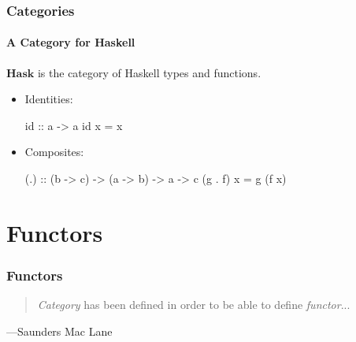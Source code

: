 \documentclass{beamer}
\newcommand{\catbf}[1]{\ensuremath{\mathbf{#1}}\xspace}
\newcommand{\hask}{\catbf{Hask}}
\begin{document}

\begin{frame}[fragile]
  \frametitle{Categories}
  \framesubtitle{A Category for Haskell}

  \begin{example}
    \hask is the category of Haskell types and functions.
    \begin{itemize}
    \item
      Identities:
      \begin{code}
id :: a -> a
id x = x
      \end{code}
    \item
      Composites:
      \begin{code}
(.) :: (b -> c) -> (a -> b) -> a -> c
(g . f) x = g (f x)
      \end{code}
    \end{itemize}
  \end{example}

\end{frame}


\section{Functors}


\begin{frame}
  \frametitle{Functors}

  \begin{quote}
    \emph{Category} has been defined in order to be able to define
    \emph{functor}...
  \end{quote}
  \hfill ---Saunders Mac Lane

\end{frame}

\end{document}
